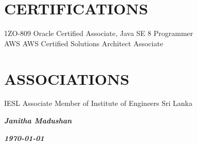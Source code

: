 \documentclass[]{cv-class}
\begin{document}
\section{CERTIFICATIONS}
\begin{entrylist}
\entry
    {}
	{1ZO-809}
    {}
	{Oracle Certified Associate, Java SE 8 Programmer}
\\
\entry
    {}
	{AWS}
    {}
	{AWS Certified Solutions Architect Associate}
\end{entrylist}


\section{ASSOCIATIONS}
\begin{entrylist}
\entry
    {}
	{IESL}    
    {}
	{Associate Member of Institute of Engineers Sri Lanka}
\end{entrylist}

\begin{flushright}
\emph{\textbf{Janitha Madushan}}
\end{flushright}
\begin{flushright}
\emph{\textbf{\today}}
\end{flushright}
\end{document}
